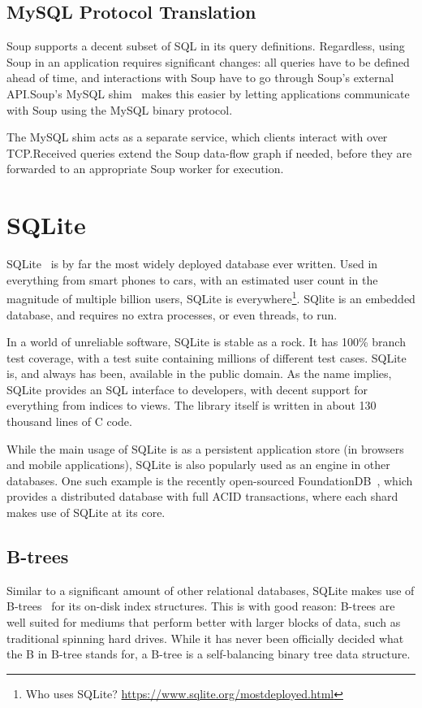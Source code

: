 \subsection{MySQL Protocol Translation}\label{sec:mysql-shim}

Soup supports a decent subset of SQL in its query definitions. Regardless, using
Soup in an application requires significant changes: all queries have to be
defined ahead of time, and interactions with Soup have to go through Soup's
external API.\@ Soup's MySQL shim~\cite{soup-mysql} makes this easier by letting
applications communicate with Soup using the MySQL binary protocol.

The MySQL shim acts as a separate service, which clients interact with over
TCP.\@ Received queries extend the Soup data-flow graph if needed, before they
are forwarded to an appropriate Soup worker for execution.


\section{SQLite}\label{sec:sqlite}
SQLite~\cite{sqlite} is by far the most widely deployed database ever written.
Used in everything from smart phones to cars, with an estimated user count in
the magnitude of multiple billion users, SQLite is everywhere\footnote{Who
uses SQLite? \url{https://www.sqlite.org/mostdeployed.html}}. SQlite is an
embedded database, and requires no extra processes, or even threads, to run.

In a world of unreliable software, SQLite is stable as a rock. It has 100\%
branch test coverage, with a test suite containing millions of different test
cases. SQLite is, and always has been, available in the public domain. As the
name implies, SQLite provides an SQL interface to developers, with decent support
for everything from indices to views. The library itself is written in about 130
thousand lines of C code.

While the main usage of SQLite is as a persistent application store (\eg in
browsers and mobile applications), SQLite is also popularly used as an engine in
other databases. One such example is the recently open-sourced
FoundationDB~\cite{foundation}, which provides a distributed database with full
ACID transactions, where each shard makes use of SQLite at its core.

\subsection{B-trees}\label{sec:btree}
Similar to a significant amount of other relational databases, SQLite makes use
of B-trees~\cite{btree} for its on-disk index structures. This is with good
reason: B-trees are well suited for mediums that perform better with larger
blocks of data, such as traditional spinning hard drives. While it has never
been officially decided what the B in B-tree stands for, a B-tree is a
self-balancing binary tree data structure.

